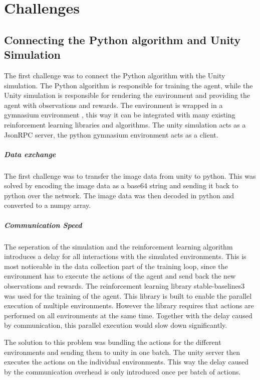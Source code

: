 \chapter{Challenges}
\label{cha:challenges}

\section{Connecting the Python algorithm and Unity Simulation}

The first challenge was to connect the Python algorithm with the Unity simulation. The Python algorithm is responsible for training the agent, while the Unity simulation is responsible for rendering the environment and providing the agent with observations and rewards. The environment is wrapped in a gymnasium environment \autocite{gymnasium}, this way it can be integrated with many existing reinforcement learning libraries and algorithms. The unity simulation acts as a JsonRPC server, the python gymnasium environment acts as a client.

\paragraph{Data exchange}
The first challenge was to transfer the image data from unity to python. This was solved by encoding the image data as a base64 string and sending it back to python over the network. The image data was then decoded in python and converted to a numpy array.

\paragraph{Communication Speed}
The seperation of the simulation and the reinforcement learning algorithm introduces a delay for all interactions with the simulated environments. This is most noticeable in the data collection part of the training loop, since the environment has to execute the actions of the agent and send back the new observations and rewards. 
The reinforcement learning library stable-baselines3 \autocite{sb3} was used for the training of the agent. This library is built to enable the parallel execution of multiple environments. However the library requires that actions are performed on all environments at the same time. Together with the delay caused by communication, this parallel execution would slow down significantly.

The solution to this problem was bundling the actions for the different environments and sending them to unity in one batch. The unity server then executes the actions on the individual environments. This way the delay caused by the communication overhead is only introduced once per batch of actions.


